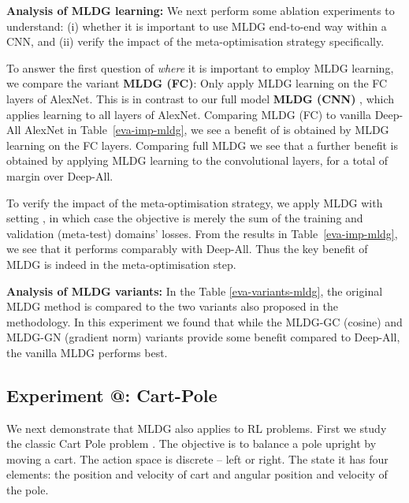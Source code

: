 \documentclass[letterpaper]{article} \usepackage{aaai18}  \usepackage{times}  \usepackage{helvet}  \usepackage{courier}  \usepackage{url}  \usepackage{graphicx}  \usepackage{amsmath}
\makeatletter
\newcommand*{\rom}[1]{\expandafter\@slowromancap\romannumeral #1@}
\newcommand{\keypoint}[1]{\vspace{0.1cm}\noindent\textbf{#1}\quad}
\makeatother
\begin{document}
{\keypoint{Analysis of MLDG learning:}  We next perform some ablation experiments to understand: (i) whether it is important to use MLDG end-to-end way within a CNN, and (ii) verify the impact of the meta-optimisation strategy specifically. 

To answer the first question of \emph{where} it is important to employ MLDG learning, we compare the variant \textbf{MLDG (FC)}: Only apply MLDG learning on the {FC} layers of AlexNet. This is in contrast to our full model \textbf{MLDG (CNN) }, which applies learning to all layers of AlexNet. Comparing MLDG (FC) to vanilla Deep-All AlexNet in Table~\ref{eva-imp-mldg}, we see a benefit of  is obtained by  MLDG learning on the FC layers. Comparing full MLDG we see that a further  benefit is obtained by applying MLDG learning to the convolutional layers, for a total of  margin over Deep-All.

To verify the impact of the meta-optimisation strategy, we apply MLDG with setting , in which case the objective is merely the sum of the training and validation (meta-test) domains' losses. From the results in  Table~\ref{eva-imp-mldg}, we see that it performs comparably with Deep-All. Thus the key benefit of MLDG is indeed in the meta-optimisation step. 

\keypoint{Analysis of MLDG variants:} In the Table \ref{eva-variants-mldg}, the original MLDG method is compared to the two variants also proposed in the methodology. 
In this experiment we found that while the MLDG-GC (cosine) and MLDG-GN (gradient norm) variants provide some benefit compared to Deep-All, the vanilla MLDG performs best. 







\subsection{Experiment \rom{3}: Cart-Pole}
We next demonstrate that MLDG also applies to RL problems. First we study the classic Cart Pole problem \cite{openaigym}. The objective is to balance a pole upright by moving a cart. The action space is discrete --  left or right. The state it has four elements: the position and velocity of cart and angular position and velocity of the pole. 

}
\end{document}

